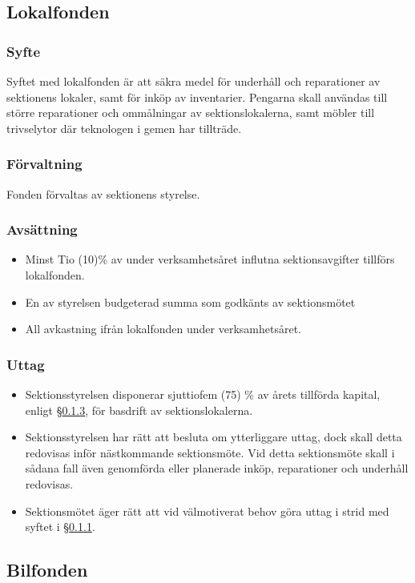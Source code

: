 \documentclass[a4paper, 10pt]{article}
\begin{document}
\subsection{Lokalfonden}
\subsubsection{Syfte}
\label{sec:lokalfond_syfte}
Syftet med lokalfonden är att säkra medel för underhåll och reparationer av sektionens lokaler, samt för inköp av inventarier. Pengarna skall användas till större reparationer och ommålningar av sektionslokalerna, samt möbler till trivselytor där teknologen i gemen har tillträde.
\subsubsection{Förvaltning}
Fonden förvaltas av sektionens styrelse.
\subsubsection{Avsättning}
\label{sec:lokalfond_avsattning}
\begin{itemize}
\item Minst Tio (10)\% av under verksamhetsåret influtna sektionsavgifter tillförs lokalfonden.
\item En av styrelsen budgeterad summa som godkänts av sektionsmötet
\item All avkastning ifrån lokalfonden under verksamhetsåret.
\end{itemize}
\subsubsection{Uttag}
\begin{itemize}
\item Sektionsstyrelsen disponerar sjuttiofem (75) \% av årets tillförda kapital,
enligt \S\ref{sec:lokalfond_avsattning}, för basdrift av sektionslokalerna. 
\item Sektionsstyrelsen har rätt att besluta om ytterliggare uttag, dock skall detta redovisas inför nästkommande sektionsmöte. Vid detta sektionsmöte skall i sådana fall även genomförda eller planerade inköp, reparationer och underhåll redovisas.
\item Sektionsmötet äger rätt att vid välmotiverat behov göra uttag i strid med syftet i \S\ref{sec:lokalfond_syfte}.
\end{itemize}

\subsection{Bilfonden}
\end{document}
